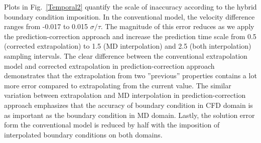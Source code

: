 \documentclass[preprint,12pt]{elsarticle}
\begin{document}
Plots in Fig.~\ref{Temporal2} quantify the scale of inaccuracy according to the hybrid boundary condition imposition. In the conventional model, the velocity difference ranges from -0.017 to 0.015 $\sigma/\tau$. The magnitude of this error reduces as we apply the prediction-correction approach and increase the prediction time scale from 0.5 (corrected extrapolation) to 1.5 (MD interpolation) and 2.5 (both interpolation) sampling intervals. The clear difference between the conventional extrapolation model and corrected extrapolation in prediction-correction approach demonstrates that the extrapolation from two ''previous'' properties contains a lot more error compared to extrapolating from the current value. The similar variation between extrapolation and MD interpolation in prediction-correction approach emphasizes that the accuracy of boundary condition in CFD domain is as important as the boundary condition in MD domain. Lastly, the solution error form the conventional model is reduced by half with the imposition of interpolated boundary conditions on both domains.
\end{document}
